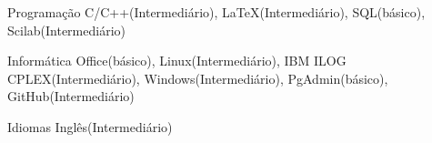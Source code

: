 

\begin{cvskills}

  \cvskill
    {Programação} %
    {C/C++(Intermediário), LaTeX(Intermediário), SQL(básico), Scilab(Intermediário)} %

  \cvskill
    {Informática} %
    {Office(básico), Linux(Intermediário), IBM ILOG CPLEX(Intermediário), Windows(Intermediário), PgAdmin(básico), GitHub(Intermediário)} %

  \cvskill
    {Idiomas} %
    {Inglês(Intermediário)} %

\end{cvskills}
